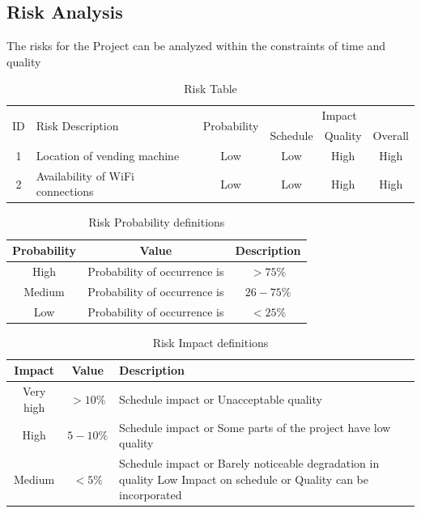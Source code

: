 \documentclass[oneside,a4paper,12pt]{report}
\begin{document}
\subsection{Risk Analysis}
The risks for the Project can be analyzed within the constraints of time and quality

\begin{table}[!htbp]
\begin{center}
\def\arraystretch{1.5}
\begin{tabularx}{\textwidth}{| c | X | c | c | c | c |}
\hline
\multirow{2}{*}{ID} & \multirow{2}{*}{Risk Description}	& \multirow{2}{*}{Probability} & \multicolumn{3}{|c|}{Impact} \\ \cline{4-6}
	& & &	Schedule	& Quality	& Overall \\ \hline
1	& Location of vending machine	& Low	& Low	& High	& High \\ \hline
2	& Availability of WiFi connections	& Low	& Low	& High	& High \\ \hline
\end{tabularx}
\end{center}
\caption{Risk Table}
\label{tab:risk}
\end{table}


\begin{table}[!htbp]
\begin{center}
\def\arraystretch{1.5}
\begin{tabular}{| c | c | c |}
\hline
Probability & Value &	Description \\ \hline
High &	Probability of occurrence is &  $ > 75 \% $ \\ \hline
Medium &	Probability of occurrence is  & $26-75 \% $ \\ \hline
Low	& Probability of occurrence is & $ < 25 \% $ \\ \hline
\end{tabular}
\end{center}
\caption{Risk Probability definitions \cite{bookPressman}}
\label{tab:riskdef}
\end{table}

\begin{table}[!htbp]
\begin{center}
\def\arraystretch{1.5}
\begin{tabularx}{\textwidth}{| c | c | X |}
\hline
Impact & Value	& Description \\ \hline
Very high &	$> 10 \%$ & Schedule impact or Unacceptable quality \\ \hline
High &	$5-10 \%$ & Schedule impact or Some parts of the project have low quality \\ \hline
Medium	& $ < 5 \% $ & Schedule impact or Barely noticeable degradation in quality Low	Impact on schedule or Quality can be incorporated \\ \hline
\end{tabularx}
\end{center}
\caption{Risk Impact definitions \cite{bookPressman}}
\label{tab:riskImpactDef}
\end{table}
\end{document}

